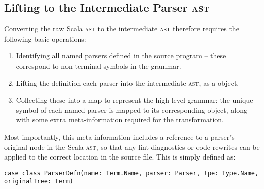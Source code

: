 \documentclass[../../main.tex]{subfiles}
\begin{document}
\subsection{Lifting to the Intermediate Parser \textsc{ast}}
Converting the raw Scala \textsc{ast} to the intermediate \textsc{ast} therefore requires the following basic operations:
\begin{enumerate}
  \item Identifying all named parsers defined in the source program -- these correspond to non-terminal symbols in the grammar.
  \item Lifting the definition each parser into the intermediate \textsc{ast}, as a  object.
  \item Collecting these into a map to represent the high-level grammar: the unique symbol of each named parser is mapped to its corresponding  object, along with some extra meta-information required for the transformation.
\end{enumerate}
%
Most importantly, this meta-information includes a reference to a parser's original node in the Scala \textsc{ast}, so that any lint diagnostics or code rewrites can be applied to the correct location in the source file.
This is simply defined as:
\begin{verbatim}
case class ParserDefn(name: Term.Name, parser: Parser, tpe: Type.Name, originalTree: Term)
\end{verbatim}
\end{document}
